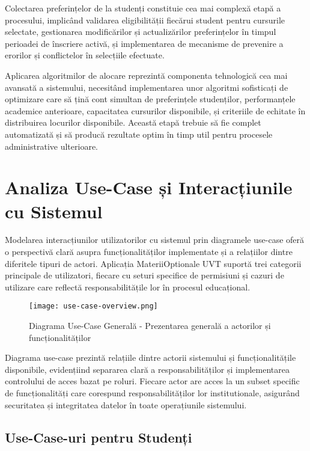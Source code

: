 \documentclass[12pt,a4paper]{report}
\begin{document}
Colectarea preferințelor de la studenți constituie cea mai complexă etapă a procesului, implicând validarea eligibilității fiecărui student pentru cursurile selectate, gestionarea modificărilor și actualizărilor preferințelor în timpul perioadei de înscriere activă, și implementarea de mecanisme de prevenire a erorilor și conflictelor în selecțiile efectuate.

Aplicarea algoritmilor de alocare reprezintă componenta tehnologică cea mai avansată a sistemului, necesitând implementarea unor algoritmi sofisticați de optimizare care să țină cont simultan de preferințele studenților, performanțele academice anterioare, capacitatea cursurilor disponibile, și criteriile de echitate în distribuirea locurilor disponibile. Această etapă trebuie să fie complet automatizată și să producă rezultate optim în timp util pentru procesele administrative ulterioare.

\section{Analiza Use-Case și Interacțiunile cu Sistemul}

Modelarea interacțiunilor utilizatorilor cu sistemul prin diagramele use-case oferă o perspectivă clară asupra funcționalităților implementate și a relațiilor dintre diferitele tipuri de actori. Aplicația MateriiOptionale UVT suportă trei categorii principale de utilizatori, fiecare cu seturi specifice de permisiuni și cazuri de utilizare care reflectă responsabilitățile lor în procesul educațional.

\begin{figure}[H]
\centering
\texttt{[image: use-case-overview.png]}
\caption{Diagrama Use-Case Generală - Prezentarea generală a actorilor și funcționalităților}
\label{fig:use-case-overview}
\end{figure}

Diagrama use-case prezintă relațiile dintre actorii sistemului și funcționalitățile disponibile, evidențiind separarea clară a responsabilităților și implementarea controlului de acces bazat pe roluri. Fiecare actor are acces la un subset specific de funcționalități care corespund responsabilităților lor institutionale, asigurând securitatea și integritatea datelor în toate operațiunile sistemului.

\subsection{Use-Case-uri pentru Studenți}
\end{document}
